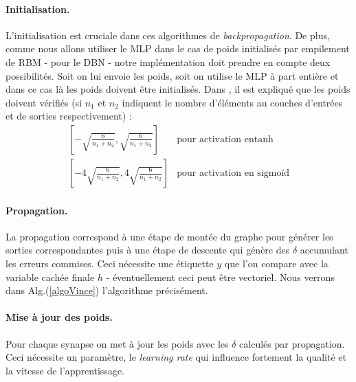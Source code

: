 \documentclass[10pt,a4paper]{article}
\begin{document}
\paragraph{Initialisation. }L'initialisation est cruciale dans ces algorithmes de \emph{backpropagation}. De plus, comme nous allons utiliser le MLP dans le cas de poids initialisés par empilement de RBM - pour le DBN - notre implémentation doit prendre en compte deux possibilités. Soit on lui envoie les poids, soit on utilise le MLP à part entière et dans ce cas là les poids doivent être initialisés. Dans \cite{GlorotAISTATS2010}, il est expliqué que les poids doivent vérifiés (si $n_1$ et $ n_2$ indiquent le nombre d'éléments au couches d'entrées et de sorties respectivement) : 
\begin{equation}
\begin{array}{ll}
\displaystyle \left[ - \sqrt{\frac{6}{n_1+n_2}} , \sqrt{\frac{6}{n_1+n_2}}\right] & \text{pour activation en} \tanh \\
\displaystyle \left[ - 4\sqrt{\frac{6}{n_1+n_2}} , 4\sqrt{\frac{6}{n_1+n_2}}\right] & \text{pour activation en sigmoïd} 
\end{array}
\end{equation}


\paragraph{Propagation. }La propagation correspond à une étape de montée du graphe pour générer les sorties correspondantes puis à une étape de descente qui génère des $\delta$ accumulant les erreurs commises. Ceci nécessite une étiquette $y$ que l'on compare avec la variable cachée finale $h$ - éventuellement ceci peut être vectoriel. Nous verrons dans Alg.(\ref{algoVince}) l'algorithme précisément. 

\paragraph{Mise à jour des poids. }Pour chaque synapse on met à jour les poids avec les $\delta$ calculés par propagation. Ceci nécessite un paramètre, le \emph{learning rate} qui influence fortement la qualité et la vitesse de l'apprentissage. \\
\end{document}
